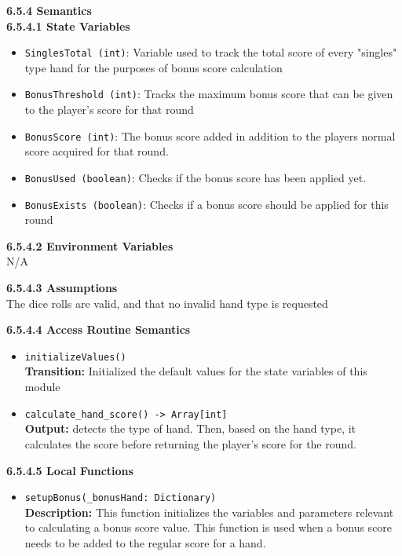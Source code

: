 \documentclass[12pt, titlepage]{article}
\begin{document}
\noindent \textbf{6.5.4 Semantics}\\
\textbf{6.5.4.1 State Variables}\\
\begin{itemize}
	\item \texttt{SinglesTotal (int)}: Variable used to track the total score of every "singles" type hand for the purposes of bonus score calculation
    \item \texttt{BonusThreshold (int)}: Tracks the maximum bonus score that can be given to the player's score for that round
    \item \texttt{BonusScore (int)}: The bonus score added in addition to the players normal score acquired for that round.
    \item \texttt{BonusUsed (boolean)}: Checks if the bonus score has been applied yet.
    \item \texttt{BonusExists (boolean)}: Checks if a bonus score should be applied for this round
\end{itemize}

\textbf{6.5.4.2 Environment Variables}\\
N/A

\textbf{6.5.4.3 Assumptions}\\
The dice rolls are valid, and that no invalid hand type is requested

\textbf{6.5.4.4 Access Routine Semantics}
\begin{itemize}

	\item \texttt{initializeValues()}\\
	\textbf{Transition:} Initialized the default values for the state variables of this module
	
	\item \texttt{calculate\_hand\_score() -> Array[int]}\\
	\textbf{Output:} detects the type of hand. Then, based on the hand type, it calculates the score before returning the player's score for the round.
	

\end{itemize}

\textbf{6.5.4.5 Local Functions}
\begin{itemize}
    \item \texttt{setupBonus(\_bonusHand: Dictionary)}\\
    \textbf{Description:} This function initializes the variables and parameters relevant to calculating a bonus score value. This function is used when a bonus score needs to be added to the regular score for a hand.

\end{itemize}
\end{document}
